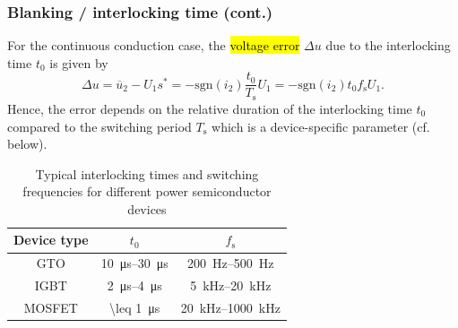 \begin{frame}
	\frametitle{Blanking / interlocking time (cont.)}
	For the continuous conduction case, the \hl{voltage error} $\Delta u$ due to the interlocking time $t_0$ is given by
	\begin{equation}
		\Delta u =\overline{u}_2 - U_1s^* = -\mathrm{sgn}(i_2)\frac{t_0}{T_\mathrm{s}}  U_1= -\mathrm{sgn}(i_2)t_0 f_\mathrm{s} U_1.
	\end{equation}
	\pause
	Hence, the error depends on the relative duration of the interlocking time $t_0$ compared to the switching period $T_\mathrm{s}$ which is a device-specific parameter (cf. below).

	\begin{table}
		\begin{tabular}{c c c}
			\toprule
			Device type & $t_0$                           & $f_\mathrm{s}$                  \\
			\midrule
			GTO         & \SIrange{10}{30}{\micro\second} & \SIrange{200}{500}{\hertz}      \\
			IGBT        & \SIrange{2}{4}{\micro\second}   & \SIrange{5}{20}{\kilo\hertz}    \\
			MOSFET      & \SI{\leq 1}{\micro\second}      & \SIrange{20}{1000}{\kilo\hertz} \\
			\bottomrule
		\end{tabular}
		\caption{Typical interlocking times and switching frequencies for different power semiconductor devices}
		\label{tab:interlocking_times}
	\end{table}
\end{frame}

